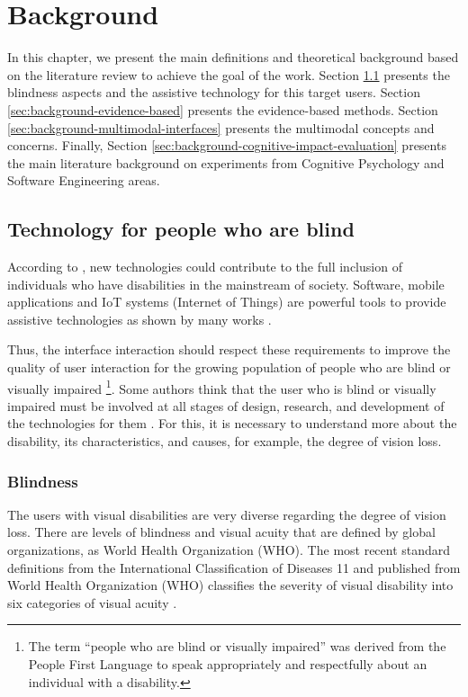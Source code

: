 \chapter{Background}
\label{cap:background}

In this chapter, we present the main definitions and theoretical background based on the literature review to achieve the goal of the work. Section \ref{sec:background-technology} presents the blindness aspects and the assistive technology for this target users. Section \ref{sec:background-evidence-based} presents the evidence-based methods. Section \ref{sec:background-multimodal-interfaces} presents the multimodal concepts and concerns. Finally, Section
\ref{sec:background-cognitive-impact-evaluation} presents the main literature background on experiments from Cognitive Psychology and Software Engineering areas.

\section{Technology for people who are blind}
\label{sec:background-technology}
According to , new technologies could contribute to the full inclusion of individuals who have disabilities in the mainstream of society. Software, mobile applications and IoT systems (Internet of Things) are powerful tools to provide assistive technologies as shown by many works \cite{AudioGene}\cite{2014213}\cite{Maike2016}.

Thus, the interface interaction should respect these requirements to improve the quality of user interaction for the growing population of people who are blind or visually impaired \footnote{The term ``people who are blind or visually impaired'' was derived from the People First Language to speak appropriately and respectfully about an individual with a disability.}. Some authors think that the user who is blind or visually impaired must be involved at all stages of design, research, and development of the technologies for them \cite{2012137}. For this, it is necessary to understand more about the disability, its characteristics, and causes, for example, the degree of vision loss. 

\subsection{Blindness}
\label{subsec:background-blindness}
The users with visual disabilities are very diverse regarding the degree of vision loss. There are levels of blindness and visual acuity that are defined by global organizations, as World Health Organization (\gls{WHO}). The most recent standard definitions from the International Classification of Diseases 11 \cite{WHO2018ICD} and published from World Health Organization (\gls{WHO}) classifies the severity of visual disability into six categories of visual acuity \cite{WHO2018Blindness}.

